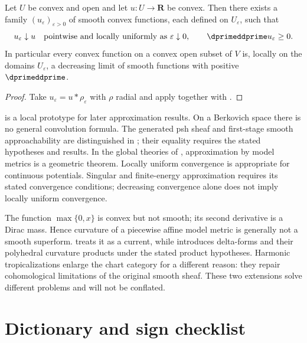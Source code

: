 \begin{corollary}
\label{cor:ch09-monotone-smooth-approximation}
Let $U$ be convex and open and let $u:U\to\mathbf R$ be convex.  Then there
exists a family $(u_\varepsilon)_{\varepsilon>0}$ of smooth convex functions,
each defined on $U_\varepsilon$, such that
\[
 u_\varepsilon\downarrow u\quad\text{pointwise and locally uniformly as }
 \varepsilon\downarrow0,
 \qquad
 \dprimeddprime u_\varepsilon\geq0 .
\]
In particular every convex function on a convex open subset of $V$ is,
locally on the domains $U_\varepsilon$, a decreasing limit of smooth
functions with positive $\dprimeddprime$.
\end{corollary}

\begin{proof}
Take $u_\varepsilon=u*\rho_\varepsilon$ with $\rho$ radial and apply
 together with
.
\end{proof}

 is a local prototype for later
approximation results.  On a Berkovich space there is no general convolution
formula.  The generated psh sheaf and first-stage smooth approachability
are distinguished in ; their equality requires the
stated hypotheses and results.  In the global theories of
, approximation by model metrics is a geometric
theorem.  Locally uniform convergence is appropriate for continuous
potentials.  Singular and finite-energy approximation requires its stated
convergence conditions; decreasing convergence alone does not imply locally
uniform convergence.

\begin{remark}
\label{rem:ch09-smooth-boundary}
The function $\max\{0,x\}$ is convex but not smooth; its second derivative is
a Dirac mass. Hence curvature of a piecewise affine model metric is generally
not a smooth superform.  treats it as a current, while
 introduces delta-forms and their polyhedral
curvature products under the stated product hypotheses.
Harmonic tropicalizations enlarge the chart category for a different reason:
they repair cohomological limitations of the original smooth sheaf. These two
extensions solve different problems and will not be conflated.
\end{remark}

\section{Dictionary and sign checklist}
\label{sec:ch09-dictionary}

